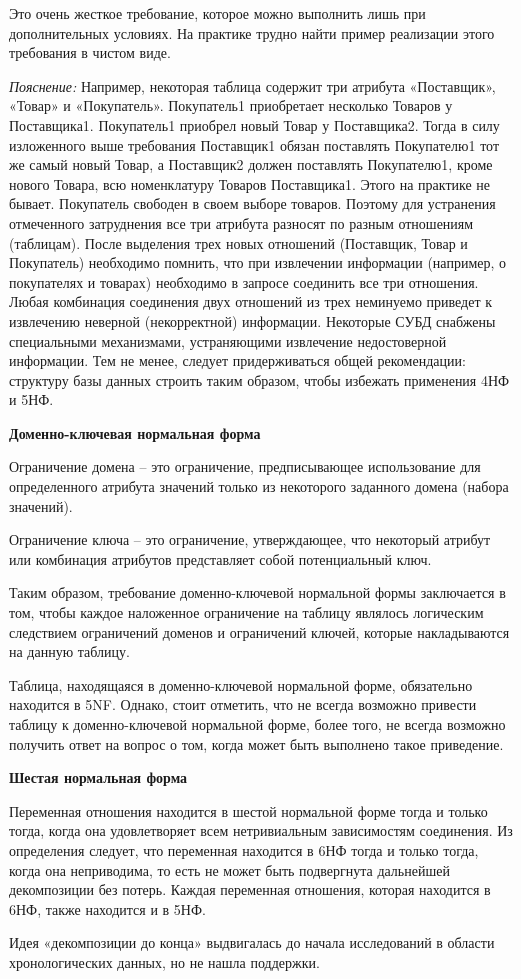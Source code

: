 Это очень жесткое требование, которое можно выполнить лишь при дополнительных условиях. На практике трудно найти пример реализации этого требования в чистом виде.

\textit{Пояснение:} Например, некоторая таблица содержит три атрибута «Поставщик», «Товар» и «Покупатель». Покупатель1 приобретает несколько Товаров у Поставщика1. Покупатель1 приобрел новый Товар у Поставщика2. Тогда в силу изложенного выше требования Поставщик1 обязан поставлять Покупателю1 тот же самый новый Товар, а Поставщик2 должен поставлять Покупателю1, кроме нового Товара, всю номенклатуру Товаров Поставщика1. Этого на практике не бывает. Покупатель свободен в своем выборе товаров. Поэтому для устранения отмеченного затруднения все три атрибута разносят по разным отношениям (таблицам). После выделения трех новых отношений (Поставщик, Товар и Покупатель) необходимо помнить, что при извлечении информации (например, о покупателях и товарах) необходимо в запросе соединить все три отношения. Любая комбинация соединения двух отношений из трех неминуемо приведет к извлечению неверной (некорректной) информации. Некоторые СУБД снабжены специальными механизмами, устраняющими извлечение недостоверной информации. Тем не менее, следует придерживаться общей рекомендации: структуру базы данных строить таким образом, чтобы избежать применения 4НФ и 5НФ.



\textbf{Доменно-ключевая нормальная форма}

Ограничение домена – это ограничение, предписывающее использование для определенного атрибута значений только из некоторого заданного домена (набора значений).

Ограничение ключа – это ограничение, утверждающее, что некоторый атрибут или комбинация атрибутов представляет собой потенциальный ключ.

Таким образом, требование доменно-ключевой нормальной формы заключается в том, чтобы каждое наложенное ограничение на таблицу являлось логическим следствием ограничений доменов и ограничений ключей, которые накладываются на данную таблицу.

Таблица, находящаяся в доменно-ключевой нормальной форме, обязательно находится в 5NF. Однако, стоит отметить, что не всегда возможно привести таблицу к доменно-ключевой нормальной форме, более того, не всегда возможно получить ответ на вопрос о том, когда может быть выполнено такое приведение.

\textbf{Шестая нормальная форма}

Переменная отношения находится в шестой нормальной форме тогда и только тогда, когда она удовлетворяет всем нетривиальным зависимостям соединения. Из определения следует, что переменная находится в 6НФ тогда и только тогда, когда она неприводима, то есть не может быть подвергнута дальнейшей декомпозиции без потерь. Каждая переменная отношения, которая находится в 6НФ, также находится и в 5НФ.

Идея «декомпозиции до конца» выдвигалась до начала исследований в области хронологических данных, но не нашла поддержки.